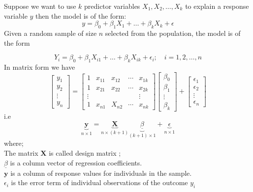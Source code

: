 \documentclass{article}
\numberwithin{equation}{section}
\begin{document}
Suppose we want to use $k$ predictor variables $X_1, X_2, \ldots, X_k$ to explain a response variable $y$ then the model is of the form:
\begin{equation}
	y=\beta_0+\beta_1 X_1+\ldots+\beta_k X_k+\epsilon
	\label{eq:methodology_eq1}
\end{equation}
Given a random sample of size $n$ selected from the population, the model is of the form

\begin{equation}
	Y_i=\beta_0+\beta_1 X_{i 1}+\ldots+\beta_k X_{i k}+\epsilon_i ; \quad i=1,2, \ldots, n
	\label{eq:methodology_eq2}
\end{equation}
In matrix form we have
$$
\left[\begin{array}{c}
	y_1 \\
	y_2 \\
	\vdots \\
	y_n
\end{array}\right]=\left[\begin{array}{ccccc}
	1 & x_{11} & x_{12} & \cdots & x_{1 k} \\
	1 & x_{21} & x_{22} & \cdots & x_{2 k} \\
	\vdots & & & & \vdots \\
	1 & x_{n 1} & X_{n 2} & \cdots & x_{n k}
\end{array}\right]\left[\begin{array}{c}
	\beta_0 \\
	\beta_1 \\
	\vdots \\
	\beta_k
\end{array}\right]+\left[\begin{array}{c}
	\epsilon_1 \\
	\epsilon_2 \\
	\vdots \\
	\epsilon_n
\end{array}\right]
$$
i.e
\begin{equation}
	\underbrace{\mathbf{y}}_{n \times 1}=\underbrace{\mathbf{X}}_{n \times(k+1)} \underbrace{\underline{\beta}}_{(k+1) \times 1}+\underbrace{\epsilon}_{n \times 1}
\end{equation}
where;\\
The matrix $\mathbf{X}$ is called design matrix ;\\
$\underline{\beta}$ is a column vector of regression coefficients.\\
$\mathbf{y}$ is a column of response values for individuals in the sample.\\
$\epsilon_i$ is the error term of individual observations of the outcome $y_i$ 
\end{document}
